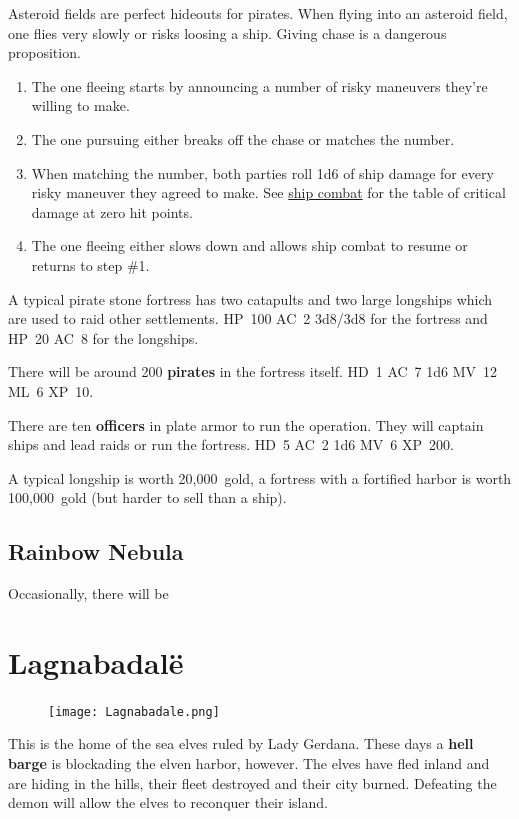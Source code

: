 \documentclass[11pt]{bxart}
\begin{document}
Asteroid fields are perfect hideouts for pirates. When flying into an
asteroid field, one flies very slowly or risks loosing a ship. Giving
chase is a dangerous proposition.

\begin{enumerate}
\item The one fleeing starts by announcing a number of risky maneuvers
  they're willing to make.
\item The one pursuing either breaks off the chase or matches the
  number.
\item When matching the number, both parties roll 1d6 of ship damage
  for every risky maneuver they agreed to make. See
  \hyperref[sec:ship-combat]{ship combat} for the table of critical
  damage at zero hit points.
\item The one fleeing either slows down and allows ship
  combat to resume or returns to step \#1.
\end{enumerate}
 
A typical pirate stone fortress has two catapults and two large
longships which are used to raid other settlements. HP~100 AC~2
3d8/3d8 for the fortress and HP~20 AC~8 for the longships.

There will be around 200 \textbf{pirates} in the fortress itself. HD~1
AC~7 1d6 MV~12 ML~6 XP~10.

There are ten \textbf{officers} in plate armor to run the operation.
They will captain ships and lead raids or run the fortress. HD~5 AC~2
1d6 MV~6 XP~200.

A typical longship is worth 20,000~gold, a fortress with a fortified
harbor is worth 100,000~gold (but harder to sell than a ship).

\subsection{Rainbow Nebula}

Occasionally, there will be 

\newpage

\section{Lagnabadalë}

\begin{figure}[t]
  \centering
  \texttt{[image: Lagnabadale.png]}
\end{figure}

This is the home of the sea elves ruled by Lady Gerdana. These days a
\textbf{hell barge} is blockading the elven harbor, however. The elves
have fled inland and are hiding in the hills, their fleet destroyed
and their city burned. Defeating the demon will allow the elves to
reconquer their island.
\end{document}
